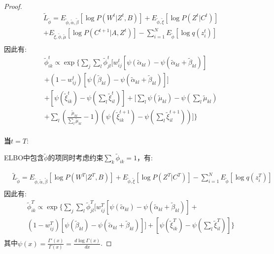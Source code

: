 \begin{proof}
	\begin{equation}
		\begin{split}
			& \widetilde{L}_{\widetilde{\phi}} = E_{\widetilde{\phi},\widetilde{\alpha},\widetilde{\beta}} [\log P(W^t|Z^t,B)]+E_{\widetilde{\phi},\widetilde{\xi}} [\log P(Z^t|C^t)]\\
			&+  E_{\widetilde{\xi},\widetilde{\phi},\widetilde{\mu}} [\log P(C^{t+1}|A,Z^t)]- \sum_{i=1}^N E_{\widetilde{\phi}}[\log q(z_i^t)]\\
		\end{split}
	\end{equation}
	因此有:
	\begin{equation}
		\label{appendix:eq9}
		\begin{split}
			&\widetilde{\phi}_{ik}^t \propto \exp \{ \sum_j \sum_l \widetilde{\phi}_{jl}^t [w_{ij}^t[\psi(\widetilde{\alpha}_{kl}) - \psi(\widetilde{\alpha}_{kl}+\widetilde{\beta}_{kl})] \\
		&	+ (1-w_{ij}^t)[\psi(\widetilde{\beta}_{kl})-\psi(\widetilde{\alpha}_{kl}+\widetilde{\beta}_{kl})]]    \\
			& + [\psi(\widetilde{\xi}_{ik}^t) - \psi(\sum_l \widetilde{\xi}_{il}^t)]+ [\sum_l \psi(\widetilde{\mu}_{kl}) - \psi(\sum_l \widetilde{\mu}_{kl}) \\
			&+\sum_l (\frac{\widetilde{\mu}_{kl}}{\sum_l \widetilde{\mu}_{kl}} -1)(\psi(\widetilde{\xi}_{ik}^{t+1}) - \psi(\sum_l \widetilde{\xi}_{il}^{t+1}))]  \}\\
		\end{split}
	\end{equation} 
	
	\textbf{当$t=T$}:
	
	ELBO中包含$\widetilde{\phi}$的项同时考虑约束$\sum_k \widetilde{\phi}_{ik} = 1 $，有:
	
	\begin{equation}
		\begin{split}
			& \widetilde{L}_{\widetilde{\phi}} = E_{\widetilde{\phi},\widetilde{\alpha},\widetilde{\beta}} [\log P(W^T|Z^T,B)]+E_{\widetilde{\phi},\widetilde{\xi}} [\log P(Z^T|C^T)]
			- \sum_{i=1}^N E_{\widetilde{\phi}}[\log q(z_i^T)]\\
		\end{split}
	\end{equation}
	因此有:
	\begin{equation}
		\label{appendix:eq10}
		\begin{split}
			&\widetilde{\phi}_{ik}^T \propto \exp \{ \sum_j \sum_l \widetilde{\phi}_{jl}^T [w_{ij}^T[\psi(\widetilde{\alpha}_{kl}) - \psi(\widetilde{\alpha}_{kl}+\widetilde{\beta}_{kl})] + \\
			&(1-w_{ij}^T)[\psi(\widetilde{\beta}_{kl})-\psi(\widetilde{\alpha}_{kl}+\widetilde{\beta}_{kl})]]  + [\psi(\widetilde{\xi}_{ik}^T) - \psi(\sum_l \widetilde{\xi}_{il}^T)]\}  \\
		\end{split}
	\end{equation} 
	其中$\psi(x) = \frac{\Gamma'(x)}{\Gamma(x)} = \frac{\,d \log \Gamma(x)}{\, dx}$.
	
\end{proof}
